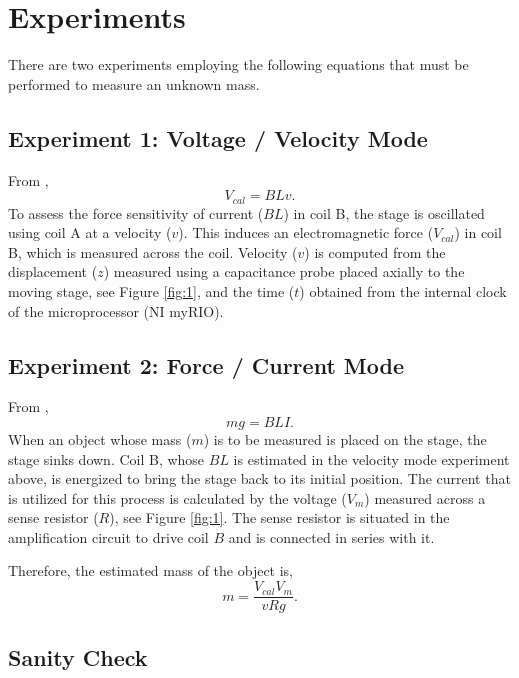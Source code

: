 \documentclass[12pt]{article}
\begin{document}
\section{Experiments}

There are two experiments employing the following equations that must be performed to measure an unknown mass.

\subsection{Experiment 1: Voltage / Velocity Mode}

From \cite{chao2015},
\begin{equation}
	V_{cal} = BLv.
\end{equation}
To assess the force sensitivity of current ($BL$) in coil B, the stage is oscillated using coil A at a velocity ($v$). This induces an electromagnetic force ($V_{cal}$) in coil B, which is measured across the coil. Velocity ($v$) is computed from the displacement ($z$) measured using a capacitance probe placed axially to the moving stage, see Figure \ref{fig:1}, and the time ($t$) obtained from the internal clock of the microprocessor (NI myRIO).

\subsection{Experiment 2: Force / Current Mode}\label{sec:experiment2}

From \cite{chao2015},
\begin{equation}
	mg = BLI.
\end{equation}
When an object whose mass ($m$) is to be measured is placed on the stage, the stage sinks down. Coil B, whose $BL$ is estimated in the velocity mode experiment above, is energized to bring the stage back to its initial position. The current that is utilized for this process is calculated by the voltage ($V_m$) measured across a sense resistor ($R$), see Figure \ref{fig:1}. The sense resistor is situated in the amplification circuit to drive coil $B$ and is connected in series with it.

Therefore, the estimated mass of the object is, 
\begin{equation}
	m = \frac{V_{cal}V_m}{vRg}.
\end{equation}
	
\subsection{Sanity Check}
\end{document}
